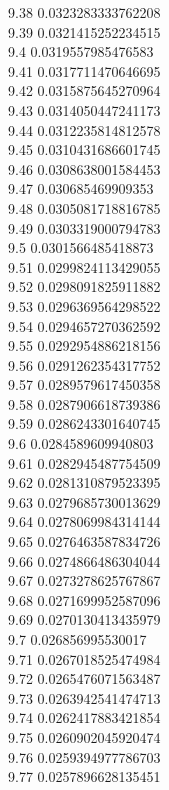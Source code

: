 {9.38	0.0323283333762208\\
9.39	0.0321415252234515\\
9.4	0.0319557985476583\\
9.41	0.0317711470646695\\
9.42	0.0315875645270964\\
9.43	0.0314050447241173\\
9.44	0.0312235814812578\\
9.45	0.0310431686601745\\
9.46	0.0308638001584453\\
9.47	0.030685469909353\\
9.48	0.0305081718816785\\
9.49	0.0303319000794783\\
9.5	0.0301566485418873\\
9.51	0.0299824113429055\\
9.52	0.0298091825911882\\
9.53	0.0296369564298522\\
9.54	0.0294657270362592\\
9.55	0.0292954886218156\\
9.56	0.0291262354317752\\
9.57	0.0289579617450358\\
9.58	0.0287906618739386\\
9.59	0.0286243301640745\\
9.6	0.0284589609940803\\
9.61	0.0282945487754509\\
9.62	0.0281310879523395\\
9.63	0.0279685730013629\\
9.64	0.0278069984314144\\
9.65	0.0276463587834726\\
9.66	0.0274866486304044\\
9.67	0.0273278625767867\\
9.68	0.0271699952587096\\
9.69	0.0270130413435979\\
9.7	0.026856995530017\\
9.71	0.0267018525474984\\
9.72	0.0265476071563487\\
9.73	0.0263942541474713\\
9.74	0.0262417883421854\\
9.75	0.0260902045920474\\
9.76	0.0259394977786703\\
9.77	0.0257896628135451\\
}
